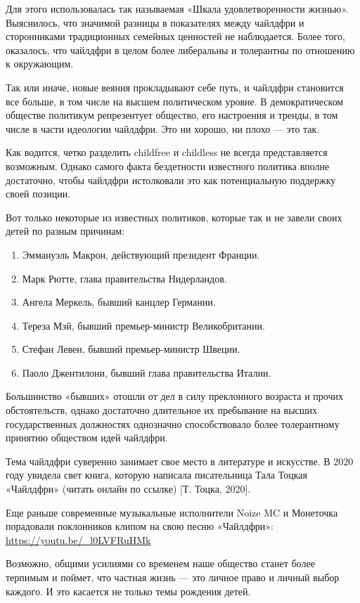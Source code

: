 Для этого использовалась так называемая «Шкала удовлетворенности жизнью». Выяснилось, что значимой разницы в показателях между чайлдфри и сторонниками традиционных семейных ценностей не наблюдается. Более того, оказалось, что чайлдфри в целом более либеральны и толерантны по отношению к окружающим.

Так или иначе, новые веяния прокладывают себе путь, и чайлдфри становится все больше, в том числе на высшем политическом уровне. В демократическом обществе политикум репрезентует общество, его настроения и тренды, в том числе в части идеологии чайлдфри. Это ни хорошо, ни плохо --- это так.

Как водится, четко разделить childfree и childless не всегда представляется возможным. Однако самого факта бездетности известного политика вполне достаточно, чтобы чайлдфри истолковали это как потенциальную поддержку своей позиции.

Вот только некоторые из известных политиков, которые так и не завели своих детей по разным причинам:
\begin{enumerate}
    \item Эммануэль Макрон, действующий президент Франции.
    \item Марк Рютте, глава правительства Нидерландов.
    \item Ангела Меркель, бывший канцлер Германии.
    \item Тереза Мэй, бывший премьер-министр Великобритании.
    \item Стефан Левен, бывший премьер-министр Швеции.
    \item Паоло Джентилони, бывший глава правительства Италии.
\end{enumerate}

Большинство «бывших» отошли от дел в силу преклонного возраста и прочих обстоятельств, однако достаточно длительное их пребывание на высших государственных должностях однозначно способствовало более толерантному принятию обществом идей чайлдфри.

Тема чайлдфри суверенно занимает свое место в литературе и искусстве. В 2020 году увидела свет книга, которую написала писательница Тала Тоцкая «Чайлдфри» (читать онлайн по ссылке) [Т. Тоцка, 2020].

Еще раньше современные музыкальные исполнители Noize MC и Монеточка порадовали поклонников клипом на свою песню «Чайлдфри»: \url{https://youtu.be/_l0LVFRuHMk}

Возможно, общими усилиями со временем наше общество станет более терпимым и поймет, что частная жизнь --- это личное право и личный выбор каждого. И это касается не только темы рождения детей.



